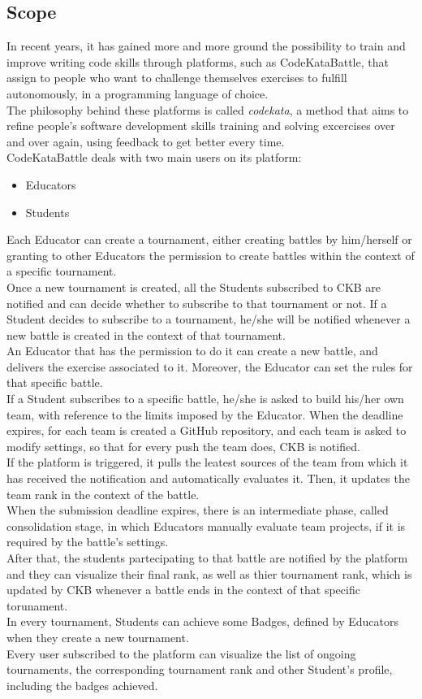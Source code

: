 \newpage

\subsection{Scope}
In recent years, it has gained more and more ground the possibility to train and improve writing code skills through platforms, such as CodeKataBattle, that assign to people who want to challenge themselves exercises to fulfill autonomously, in a programming language of choice. 
\\The philosophy behind these platforms is called \textit{codekata}, a method that aims to refine people's software development skills training and solving excercises over and over again, using feedback to get better every time.
\\CodeKataBattle deals with two main users on its platform:
\begin{itemize}
    \item Educators
    \item Students
\end{itemize}
Each Educator can create a tournament, either creating battles by him/herself or granting to other Educators the permission to create battles within the context of a specific tournament.
\\Once a new tournament is created, all the Students subscribed to CKB are notified and can decide whether to subscribe to that tournament or not. If a Student decides to subscribe to a tournament, he/she will be notified whenever a new battle is created in the context of that tournament. 
\\An Educator that has the permission to do it can create a new battle, and delivers the exercise associated to it. Moreover, the Educator can set the rules for that specific battle.
\\If a Student subscribes to a specific battle, he/she is asked to build his/her own team, with reference to the limits imposed by the Educator. When the deadline expires, for each team is created a GitHub repository, and each team is asked to modify settings, so that for every push the team does, CKB is notified.
\\If the platform is triggered, it pulls the leatest sources of the team from which it has received the notification and automatically evaluates it. Then, it updates the team rank in the context of the battle.
\\When the submission deadline expires, there is an intermediate phase, called consolidation stage, in which Educators manually evaluate team projects, if it is required by the battle's settings.
\\After that, the students partecipating to that battle are notified by the platform and they can visualize their final rank, as well as thier tournament rank, which is updated by CKB whenever a battle ends in the context of that specific torunament.  
\\In every tournament, Students can achieve some Badges, defined by Educators when they create a new tournament.
\\Every user subscribed to the platform can visualize the list of ongoing tournaments, the corresponding tournament rank and other Student's profile, including the badges achieved.

